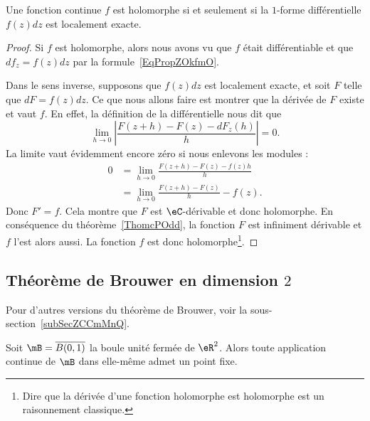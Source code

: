 \begin{proposition}\label{PropZOkfmO}
	Une fonction continue \( f\) est holomorphe si et seulement si la \( 1\)-forme différentielle \( f(z)dz\) est localement exacte.
\end{proposition}

\begin{proof}
	Si \( f\) est holomorphe, alors nous avons vu que \( f\) était différentiable et que \( df_{z}=f(z)dz\) par la formule~\ref{EqPropZOkfmO}.

	Dans le sens inverse, supposons que \( f(z)dz\) est localement exacte, et soit \( F\) telle que \( dF=f(z)dz\). Ce que nous allons faire est montrer que la dérivée de \( F\) existe et vaut \( f\). En effet, la définition de la différentielle nous dit que
	\begin{equation}
		\lim_{h\to 0} \left| \frac{ F(z+h)-F(z)-dF_z(h) }{ h } \right| =0.
	\end{equation}
	La limite vaut évidemment encore zéro si nous enlevons les modules :
	\begin{subequations}
		\begin{align}
			0 & =\lim_{h\to 0} \frac{ F(z+h)-F(z)-f(z)h }{ h } \\
			  & =\lim_{h\to 0} \frac{ F(z+h)-F(z) }{ h }-f(z).
		\end{align}
	\end{subequations}
	Donc \( F'=f\). Cela montre que \( F\) est \( \eC\)-dérivable et donc holomorphe. En conséquence du théorème~\ref{ThomcPOdd}, la fonction \( F\) est infiniment dérivable et \( f\) l'est alors aussi. La fonction \( f\) est donc holomorphe\footnote{Dire que la dérivée d'une fonction holomorphe est holomorphe est un raisonnement classique.}.
\end{proof}

\subsection{Théorème de Brouwer en dimension \texorpdfstring{\(  2\)}{2}}
Pour d'autres versions du théorème de Brouwer, voir la sous-section~\ref{subSecZCCmMnQ}.

\begin{theorem}     \label{ThoLVViheK}
	Soit \( \mB=\overline{B(0,1)}\) la boule unité fermée de \( \eR^2\). Alors toute application continue de \( \mB\) dans elle-même admet un point fixe.
\end{theorem}

